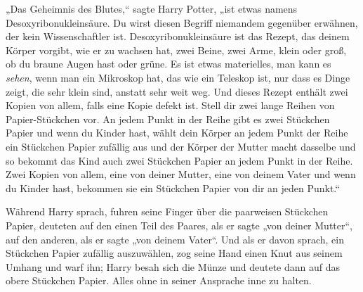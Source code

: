 „Das Geheimnis des Blutes,“ sagte Harry Potter, „ist etwas namens Desoxyribonukleinsäure. Du wirst diesen Begriff niemandem gegenüber erwähnen, der kein Wissenschaftler ist. Desoxyribonukleinsäure ist das Rezept, das deinem Körper vorgibt, wie er zu wachsen hat, zwei Beine, zwei Arme, klein oder groß, ob du braune Augen hast oder grüne. Es ist etwas materielles, man kann es \emph{sehen}, wenn man ein Mikroskop hat, das wie ein Teleskop ist, nur dass es Dinge zeigt, die sehr klein sind, anstatt sehr weit weg. Und dieses Rezept enthält zwei Kopien von allem, falls eine Kopie defekt ist. Stell dir zwei lange Reihen von Papier-Stückchen vor. An jedem Punkt in der Reihe gibt es zwei Stückchen Papier und wenn du Kinder hast, wählt dein Körper an jedem Punkt der Reihe ein Stückchen Papier zufällig aus und der Körper der Mutter macht dasselbe und so bekommt das Kind auch zwei Stückchen Papier an jedem Punkt in der Reihe. Zwei Kopien von allem, eine von deiner Mutter, eine von deinem Vater und wenn du Kinder hast, bekommen sie ein Stückchen Papier von dir an jeden Punkt.“

Während Harry sprach, fuhren seine Finger über die paarweisen Stückchen Papier, deuteten auf den einen Teil des Paares, als er sagte „von deiner Mutter“, auf den anderen, als er sagte „von deinem Vater“. Und als er davon sprach, ein Stückchen Papier zufällig auszuwählen, zog seine Hand einen Knut aus seinem Umhang und warf ihn; Harry besah sich die Münze und deutete dann auf das obere Stückchen Papier. Alles ohne in seiner Ansprache inne zu halten.

